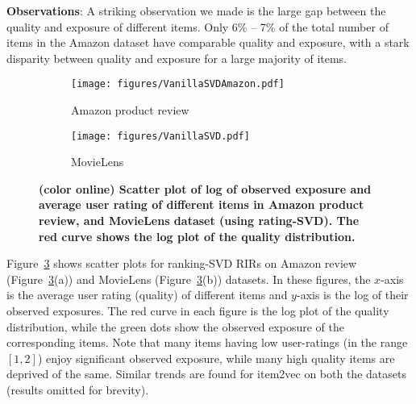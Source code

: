 \noindent
\textbf{Observations}: A striking observation we made is the large gap between the quality and exposure of different items. 
Only 6\% -- 7\% of the total number of items in the Amazon dataset have comparable quality and exposure, with a stark disparity between quality and exposure for a large majority of items. 
\begin{figure}[tb]
	\centering
	\begin{subfigure}{0.45\columnwidth}
		\centering
		\texttt{[image: figures/VanillaSVDAmazon.pdf]}
		\caption{Amazon product review}
		\label{fig: IMDbExp}
	\end{subfigure}%
	\begin{subfigure}{0.45\columnwidth}
		\centering
		\texttt{[image: figures/VanillaSVD.pdf]}
		\caption{MovieLens }%
		\label{fig: SVDExp}
	\end{subfigure}
	
	\vspace*{-2mm}
	\caption{{\bf (color online) Scatter plot of log of observed exposure and average user rating of different items in Amazon product review, and MovieLens dataset (using rating-SVD). The red curve shows the log plot of the quality distribution.}}
	\label{fig: Exp}
	\vspace*{-5 mm}
\end{figure}
Figure~\ref{fig: Exp} shows scatter plots for ranking-SVD RIRs on Amazon review (Figure~\ref{fig: Exp}(a)) and MovieLens (Figure~\ref{fig: Exp}(b)) datasets. 
In these figures, the $x$-axis is the average user rating (quality) of different items and $y$-axis is the log of their observed exposures. The red curve in each figure is the log plot of the quality distribution, while the green dots show the observed exposure of the corresponding items. Note that many items having low user-ratings (in the range $[1, 2]$) enjoy significant observed exposure, while many high quality items are deprived of the same. Similar trends are found for item2vec on both the datasets (results omitted for brevity).


